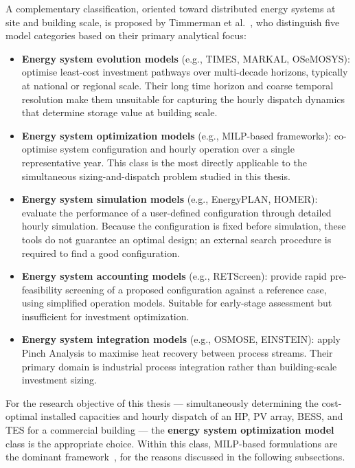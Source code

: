 \documentclass[11pt,a4paper]{report}
\begin{document}
A complementary classification, oriented toward distributed energy systems at site and building scale, is proposed by Timmerman et al.~\cite{Timmerman2014}, who distinguish five model categories based on their primary analytical focus:

\begin{itemize}
    \item \textbf{Energy system evolution models} (e.g., TIMES, MARKAL, OSeMOSYS): optimise least-cost investment pathways over multi-decade horizons, typically at national or regional scale.
    Their long time horizon and coarse temporal resolution make them unsuitable for capturing the hourly dispatch dynamics that determine storage value at building scale.

    \item \textbf{Energy system optimization models} (e.g., MILP-based frameworks): co-optimise system configuration and hourly operation over a single representative year.
    This class is the most directly applicable to the simultaneous sizing-and-dispatch problem studied in this thesis.

    \item \textbf{Energy system simulation models} (e.g., EnergyPLAN, HOMER): evaluate the performance of a user-defined configuration through detailed hourly simulation.
    Because the configuration is fixed before simulation, these tools do not guarantee an optimal design; an external search procedure is required to find a good configuration.

    \item \textbf{Energy system accounting models} (e.g., RETScreen): provide rapid pre-feasibility screening of a proposed configuration against a reference case, using simplified operation models.
    Suitable for early-stage assessment but insufficient for investment optimization.

    \item \textbf{Energy system integration models} (e.g., OSMOSE, EINSTEIN): apply Pinch Analysis to maximise heat recovery between process streams.
    Their primary domain is industrial process integration rather than building-scale investment sizing.
\end{itemize}

For the research objective of this thesis --- simultaneously determining the cost-optimal installed capacities and hourly dispatch of an HP, PV array, BESS, and TES for a commercial building --- the \textbf{energy system optimization model} class is the appropriate choice.
Within this class, MILP-based formulations are the dominant framework~\cite{Ringkjob2018, Timmerman2014}, for the reasons discussed in the following subsections.
\end{document}
